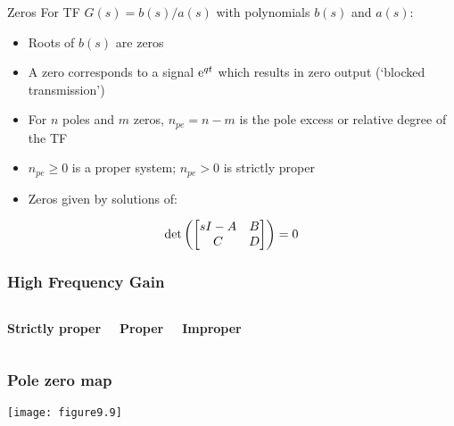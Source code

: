 \documentclass{beamer-control}
\begin{document}
\begin{frame}{Zeros}
For TF $G(s) = b(s)/a(s)$ with polynomials $b(s)$ and $a(s)$:
\begin{itemize}
\item Roots of $b(s)$ are \alert{zeros}
\item A zero corresponds to a signal $\mathrm{e}^{qt}$ which results in zero output (`blocked transmission')
\item For $n$ poles and $m$ zeros, $n_{pe} = n-m$ is the \alert{pole excess} or \alert{relative degree} of the TF
\item $n_{pe}\ge 0$ is a \alert{proper} system; $n_{pe}>0$ is \alert{strictly proper}
\item Zeros given by solutions of:
\end{itemize}
\begin{align}
\det\left(\begin{bmatrix}sI-A & B\\C & D\end{bmatrix}\right)=0
\end{align}
\end{frame}

\begin{frame}
\frametitle{High Frequency Gain}
\begin{columns}
\centerline{\textbf{Strictly proper}}

\centerline{\textbf{Proper}}

\centerline{\textbf{Improper}}
\end{columns}

\vspace*{0pt plus 1filll}
\null
\end{frame}

\begin{frame}
\frametitle{Pole zero map}

\texttt{[image: figure9.9]}


\end{frame}

\end{document}
